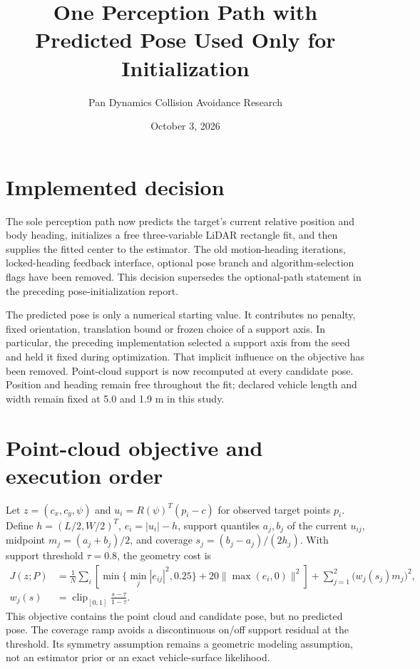 \documentclass[11pt]{article}
\title{One Perception Path with Predicted Pose Used Only for Initialization}
\author{Pan Dynamics Collision Avoidance Research}
\date{October 3, 2026}
\begin{document}
\maketitle

\section{Implemented decision}
The sole perception path now predicts the target's current relative position
and body heading, initializes a free three-variable LiDAR rectangle fit, and
then supplies the fitted center to the estimator. The old motion-heading
iterations, locked-heading feedback interface, optional pose branch and
algorithm-selection flags have been removed. This decision supersedes the
optional-path statement in the preceding pose-initialization report.

The predicted pose is only a numerical starting value. It contributes no
penalty, fixed orientation, translation bound or frozen choice of a support
axis. In particular, the preceding implementation selected a support axis
from the seed and held it fixed during optimization. That implicit influence
on the objective has been removed. Point-cloud support is now recomputed at
every candidate pose. Position and heading remain free throughout the fit;
declared vehicle length and width remain fixed at 5.0 and 1.9 m in this study.

\section{Point-cloud objective and execution order}
Let $z=(c_x,c_y,\psi)$ and $u_i=R(\psi)^T(p_i-c)$ for observed target points
$p_i$. Define $h=(L/2,W/2)^T$, $e_i=|u_i|-h$, support quantiles $a_j,b_j$
of the current $u_{ij}$, midpoint $m_j=(a_j+b_j)/2$, and coverage
$s_j=(b_j-a_j)/(2h_j)$. With support threshold $\tau=0.8$, the geometry cost is
\[
 \begin{aligned}
 J(z;P)&=\frac1N\sum_i\left[
 \min\{\min_j |e_{ij}|^2,0.25\}
 +20\|\max(e_i,0)\|^2\right]
 +\sum_{j=1}^2 \bigl(w_j(s_j)m_j\bigr)^2,\\
 w_j(s)&=\operatorname{clip}_{[0,1]}\frac{s-\tau}{1-\tau}.
 \end{aligned}
\]
This objective contains the point cloud and candidate pose, but no predicted
pose. The coverage ramp avoids a discontinuous on/off support residual at
the threshold. Its symmetry assumption remains a geometric modeling
assumption, not an estimator prior or an exact vehicle-surface likelihood.
\end{document}
